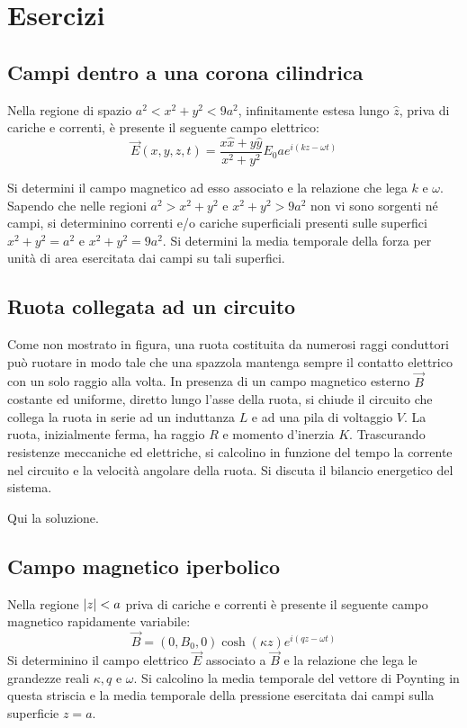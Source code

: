 \section{Esercizi}
	\subsection{Campi dentro a una corona cilindrica}
		Nella regione di spazio $a^2 < x^2 + y^2 < 9 a^2$, infinitamente estesa lungo $\hat z$, priva di cariche e correnti, è presente il seguente campo elettrico:
		\[
			\vec E(x,y,z,t)=\frac{x\hat x+y\hat y}{x^2+y^2}E_0ae^{i(kz-\omega t)}
		\]
		
		Si determini il campo magnetico ad esso associato e la relazione che lega $k$ e $\omega$. Sapendo che nelle
		regioni $a^2 > x^2 + y^2$ e $x^2 + y^2 > 9 a^2$ non vi sono sorgenti né campi, si determinino correnti e/o
		cariche superficiali presenti sulle superfici $x^2 + y^2 = a^2$ e $x^2 + y^2 = 9 a^2$. Si determini la media
		temporale della forza per unità di area esercitata dai campi su tali superfici.

	\subsection{Ruota collegata ad un circuito}
		Come non mostrato in figura, una ruota costituita da numerosi raggi conduttori può ruotare in modo tale che una spazzola mantenga sempre il contatto elettrico con un solo raggio alla volta. In presenza di un campo magnetico esterno $\vec B$ costante ed uniforme, diretto lungo l'asse della ruota, si chiude il circuito che collega la ruota in serie ad un induttanza $L$ e ad una pila di voltaggio $V$. La ruota, inizialmente ferma, ha raggio $R$ e momento d'inerzia $K$. Trascurando resistenze meccaniche ed elettriche, si calcolino in funzione del tempo la corrente nel circuito e la velocità angolare della ruota. Si discuta il bilancio energetico del sistema.
		
		\begin{sol}
		 Qui la soluzione.
		\end{sol}
	
	\subsection{Campo magnetico iperbolico}
		Nella regione $\left|z\right|<a$ priva di cariche e correnti è presente il seguente campo magnetico rapidamente variabile:
		\[
		 \vec B = (0,B_0,0) \cosh(\kappa z)e^{i(qz-\omega t)}
		\]
		Si determinino il campo elettrico $\vec E$ associato a $\vec B$ e la relazione che lega le grandezze reali $\kappa, q$ e $\omega$. Si calcolino la media temporale del vettore di Poynting in questa striscia e la media temporale della pressione esercitata dai campi sulla superficie $z=a$.
		
